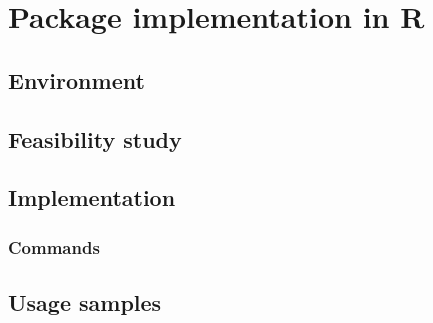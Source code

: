\chapter{Package implementation in R}
\label{cha:R}

\section{Environment}
\label{sec:enivirionment}

\section{Feasibility study}
\label{sec:study}

\section{Implementation}
\label{sec:implementation}

\subsection{Commands}
\label{sec:blocksize}

\section{Usage samples}
\label{sec:mining}
